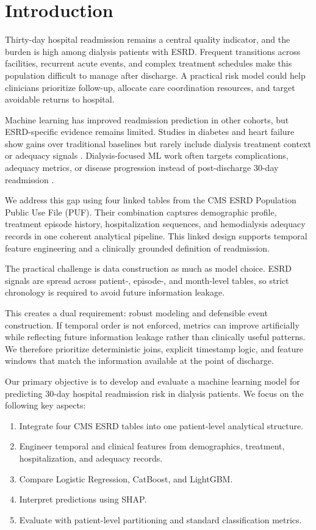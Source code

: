 \documentclass[conference]{IEEEtran}
\begin{document}
\section{Introduction}
Thirty-day hospital readmission remains a central quality indicator, and the burden is high among dialysis patients with ESRD. Frequent transitions across facilities, recurrent acute events, and complex treatment schedules make this population difficult to manage after discharge. A practical risk model could help clinicians prioritize follow-up, allocate care coordination resources, and target avoidable returns to hospital.

Machine learning has improved readmission prediction in other cohorts, but ESRD-specific evidence remains limited. Studies in diabetes and heart failure show gains over traditional baselines but rarely include dialysis treatment context or adequacy signals \cite{liu2024machine,jahangiri2024predicting}. Dialysis-focused ML work often targets complications, adequacy metrics, or disease progression instead of post-discharge 30-day readmission \cite{hsieh2023predicting,kim2021machine,wang2025machine}.

We address this gap using four linked tables from the CMS ESRD Population Public Use File (PUF). Their combination captures demographic profile, treatment episode history, hospitalization sequences, and hemodialysis adequacy records in one coherent analytical pipeline. This linked design supports temporal feature engineering and a clinically grounded definition of readmission.

The practical challenge is data construction as much as model choice. ESRD signals are spread across patient-, episode-, and month-level tables, so strict chronology is required to avoid future information leakage.

This creates a dual requirement: robust modeling and defensible event construction. If temporal order is not enforced, metrics can improve artificially while reflecting future information leakage rather than clinically useful patterns. We therefore prioritize deterministic joins, explicit timestamp logic, and feature windows that match the information available at the point of discharge.

Our primary objective is to develop and evaluate a machine learning model for predicting 30-day hospital readmission risk in dialysis patients. We focus on the following key aspects:
\begin{enumerate}
    \item Integrate four CMS ESRD tables into one patient-level analytical structure.
    \item Engineer temporal and clinical features from demographics, treatment, hospitalization, and adequacy records.
    \item Compare Logistic Regression, CatBoost, and LightGBM.
    \item Interpret predictions using SHAP.
    \item Evaluate with patient-level partitioning and standard classification metrics.
\end{enumerate}
\end{document}
